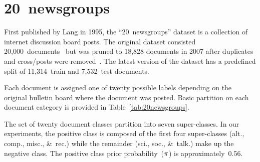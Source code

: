 \section{20~newsgroups}\label{sec:20newsgroups}

First published by Lang in 1995, the ``20~newsgroups'' dataset is a collection of internet discussion board posts.  The original dataset consisted 20,000~documents~\cite{20newsgroups} but was pruned to 18,828 documents in 2007 after duplicates and cross\-/posts were removed~\cite{Rennie:2007}.   The latest version of the dataset has a predefined split of 11,314~train and 7,532~test documents.

Each document is assigned one of twenty possible labels depending on the original bulletin board where the document was posted.  Basic partition on each document category is provided in Table~\ref{tab:20newsgroups}.

The set of twenty document classes partition into seven super-classes.  In our experiments, the positive class is composed of the first four super-classes (alt., comp., misc., \&~rec.) while the remainder (sci., soc., \&~talk.) make up the negative class.  The positive class prior probability~($\pi$) is approximately~0.56.

\begin{table}[t]
  \centering
  \caption{}\label{tab:20newsgroups}
  
\end{table}

